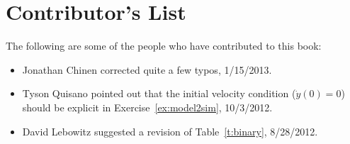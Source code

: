 \vspace{0.5in}
\section*{Contributor's List}
The following are some of the people who have contributed to this book:
\begin{itemize}
\item Jonathan Chinen corrected quite a few typos, 1/15/2013.
\item Tyson Quisano pointed out that the initial velocity condition ($\dot{y}(0)=0$) should be explicit in Exercise~\ref{ex:model2sim}, 10/3/2012.
\item David Lebowitz suggested a revision of Table~\ref{t:binary}, 8/28/2012.
\end{itemize}

